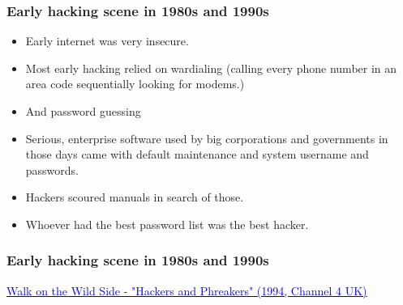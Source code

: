 \documentclass[aspectratio=169,usenames,dvipsnames]{beamer}
\begin{document}
\begin{frame}
  \frametitle{Early hacking scene in 1980s and 1990s}

  \begin{itemize}[<+->]
    \item Early internet was very insecure.
    \item Most early hacking relied on wardialing (calling every phone number
      in an area code sequentially looking for modems.)
    \item And password guessing
    \item Serious, enterprise software used by big corporations and
      governments in those days came with default maintenance and system
      username and passwords.
    \item Hackers scoured manuals in search of those.
    \item Whoever had the best password list was the best hacker.
  \end{itemize}
\end{frame}

\begin{frame}
  \frametitle{Early hacking scene in 1980s and 1990s}

  \centering

  \footnotesize
  \href{https://www.youtube.com/watch?v=0a_4IR4v5no&t=74}{\textcolor{blue}{Walk
  on the Wild Side - "Hackers and Phreakers" (1994, Channel 4 UK)}}
\end{frame}
\end{document}
